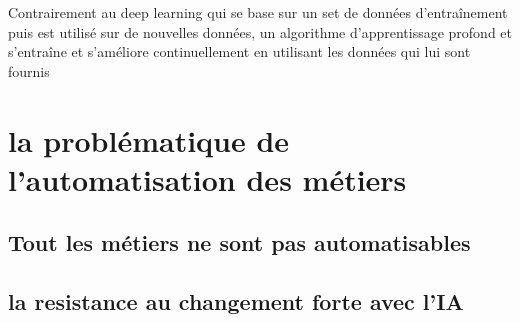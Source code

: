 Contrairement au deep learning qui se base sur un set de données d'entraînement
puis est utilisé sur de nouvelles données, un algorithme d'apprentissage profond
et s'entraîne et s'améliore continuellement en utilisant les données qui lui sont 
fournis





\section{la problématique de l'automatisation des métiers}

\subsection{Tout les métiers ne sont pas automatisables}
\subsection{la resistance au changement forte avec l'IA}
